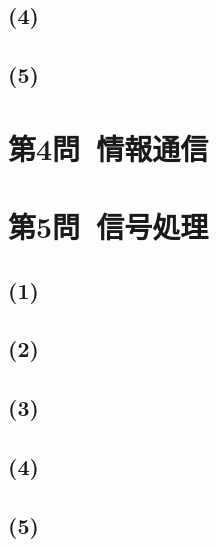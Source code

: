 \documentclass[a4paper,12pt,xelatex,ja=standard]{bxjsarticle}
\begin{document}
\subsection*{(4)}

\subsection*{(5)}

\section*{第4問\ 情報通信}

\section*{第5問\ 信号処理}
\subsection*{(1)}

\subsection*{(2)}

\subsection*{(3)}

\subsection*{(4)}

\subsection*{(5)}
\end{document}
